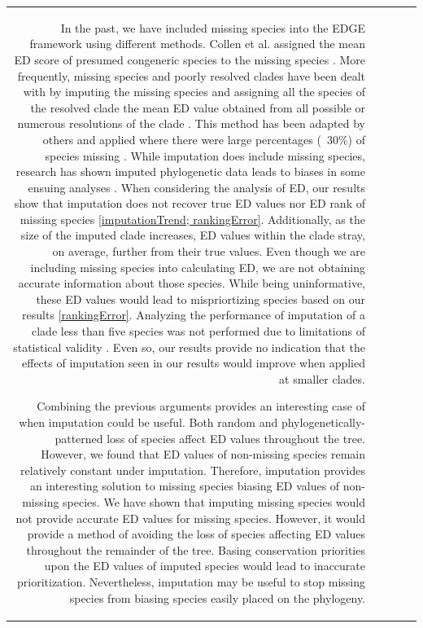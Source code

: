 \documentclass[12pt,english]{article}
\begin{document}
\begin{table}[ht]
\begin{tabular}{rrrrr}
In the past, we have included missing species into the EDGE framework using
different methods. Collen et al. assigned the mean ED score of presumed
congeneric species to the missing species \citeyear{Collen2011}. More
frequently, missing species and poorly resolved clades have been dealt with by
imputing the missing species and assigning all the species of the resolved
clade the mean ED value obtained from all possible or numerous resolutions of
the clade \autocite{Isaac2007; Isaac2012}. This method has been adapted by
others and applied where there were large percentages (~30\%) of species
missing \autocite{Jetz2014}. While imputation does include missing species,
research has shown imputed phylogenetic data leads to biases in some ensuing
analyses \autocite{Rabosky2014}. When considering the analysis of ED, our
results show that imputation does not recover true ED values nor ED rank of
missing species \ref{imputationTrend; rankingError}. Additionally, as the size
of the imputed clade increases, ED values within the clade stray, on average,
further from their true values. Even though we are including missing species
into calculating ED, we are not obtaining accurate information about those
species. While being uninformative, these ED values would lead to
mispriortizing species based on our results \ref{rankingError}. Analyzing the
performance of imputation of a clade less than five species was not performed
due to limitations of statistical validity \autocite{Crawley2012}. Even so, our
results provide no indication that the effects of imputation seen in our
results would improve when applied at smaller clades.

Combining the previous arguments provides an interesting case of when imputation
could be useful. Both random and phylogenetically-patterned loss of species
affect ED values throughout the tree. However, we found that ED values of
non-missing species remain relatively constant under imputation. Therefore,
imputation provides an interesting solution to missing species biasing ED
values of non-missing species. We have shown that imputing missing species would
not provide accurate ED values for missing species. However, it would provide a
method of avoiding the loss of species affecting ED values throughout the
remainder of the tree. Basing conservation priorities upon the ED values of
imputed species would lead to inaccurate prioritization. Nevertheless,
imputation may be useful to stop missing species from biasing species easily
placed on the phylogeny.


\end{tabular}
\end{table}
\end{document}
